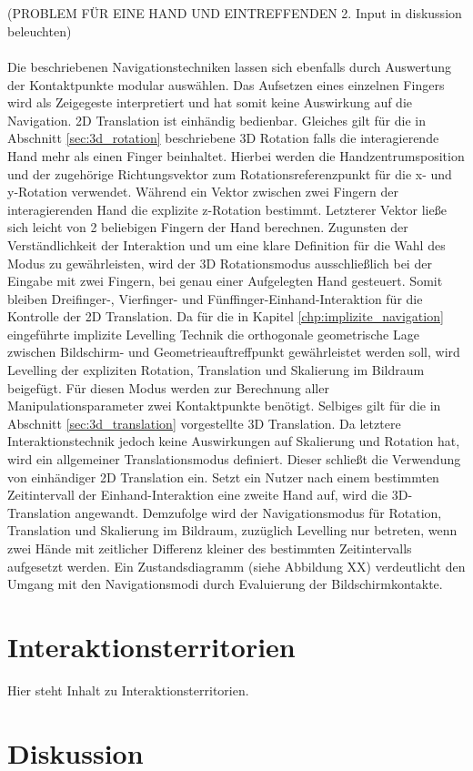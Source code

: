 \\\\
(PROBLEM FÜR EINE HAND UND EINTREFFENDEN 2. Input in diskussion beleuchten)
\\\\
Die beschriebenen Navigationstechniken lassen sich ebenfalls durch Auswertung der Kontaktpunkte modular auswählen. Das Aufsetzen eines einzelnen Fingers wird als Zeigegeste interpretiert und hat somit keine Auswirkung auf die Navigation. 2D Translation ist einhändig bedienbar. Gleiches gilt für die in Abschnitt \ref{sec:3d_rotation} beschriebene 3D Rotation falls die interagierende Hand mehr als einen Finger beinhaltet. Hierbei werden die Handzentrumsposition und der zugehörige Richtungsvektor zum Rotationsreferenzpunkt für die x- und y-Rotation verwendet. Während ein Vektor zwischen zwei Fingern der interagierenden Hand die explizite z-Rotation bestimmt. Letzterer Vektor ließe sich  leicht von 2 beliebigen Fingern der Hand berechnen. Zugunsten der Verständlichkeit der Interaktion und um eine klare Definition für die Wahl des Modus zu gewährleisten, wird der 3D Rotationsmodus ausschließlich bei der Eingabe mit zwei Fingern, bei genau einer Aufgelegten Hand gesteuert. Somit bleiben Dreifinger-, Vierfinger- und Fünffinger-Einhand-Interaktion für die Kontrolle der 2D Translation. Da für die in Kapitel \ref{chp:implizite_navigation} eingeführte implizite Levelling Technik die orthogonale geometrische Lage zwischen Bildschirm- und Geometrieauftreffpunkt gewährleistet werden soll, wird Levelling der expliziten Rotation, Translation und Skalierung im Bildraum beigefügt. Für diesen Modus werden zur Berechnung aller Manipulationsparameter zwei Kontaktpunkte benötigt. Selbiges gilt für die in Abschnitt \ref{sec:3d_translation} vorgestellte 3D Translation. Da letztere Interaktionstechnik jedoch keine Auswirkungen auf Skalierung und Rotation hat, wird ein allgemeiner Translationsmodus definiert. Dieser schließt die Verwendung von einhändiger 2D Translation ein. Setzt ein Nutzer nach einem bestimmten Zeitintervall der Einhand-Interaktion eine zweite Hand auf, wird die  3D-Translation angewandt. Demzufolge wird der Navigationsmodus für Rotation, Translation und Skalierung im Bildraum, zuzüglich Levelling nur betreten, wenn zwei Hände mit zeitlicher Differenz kleiner des bestimmten Zeitintervalls aufgesetzt werden. Ein Zustandsdiagramm (siehe Abbildung XX) verdeutlicht den Umgang mit den Navigationsmodi durch Evaluierung der Bildschirmkontakte.


\section{Interaktionsterritorien}
\label{sec:interaktionsterritorien}

Hier steht Inhalt zu Interaktionsterritorien.


\section{Diskussion}
\label{sec:diskussion_wechsel}